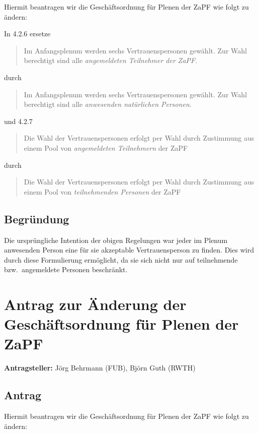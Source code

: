 \documentclass[draft,10pt,oneside]{scrartcl}
\begin{document}
Hiermit beantragen wir die Geschäftsordnung für Plenen der ZaPF wie folgt zu
ändern:

In 4.2.6 ersetze
\begin{quote}
  Im Anfangsplenum werden sechs Vertrauenspersonen gewählt. Zur Wahl berechtigt
  sind alle \emph{angemeldeten Teilnehmer der ZaPF}.
\end{quote}
durch
\begin{quote}
  Im Anfangsplenum werden sechs Vertrauenspersonen gewählt. Zur Wahl berechtigt
  sind alle \emph{anwesenden natürlichen Personen}.
\end{quote}
und 4.2.7
\begin{quote}
  Die Wahl der Vertrauenspersonen erfolgt per Wahl durch Zustimmung aus einem
  Pool von \emph{angemeldeten Teilnehmern} der ZaPF
\end{quote}
durch
\begin{quote}
  Die Wahl der Vertrauenspersonen erfolgt per Wahl durch Zustimmung aus einem
  Pool von \emph{teilnehmenden Personen} der ZaPF
\end{quote}

\subsection*{Begründung}

Die ursprüngliche Intention der obigen Regelungen war jeder im Plenum anwesenden
Person eine für sie akzeptable Vertrauensperson zu finden. Dies wird durch diese
Formulierung ermöglicht, da sie sich nicht nur auf teilnehmende bzw.\  angemeldete
Personen beschränkt.

\newpage

\section*{Antrag zur Änderung der Geschäftsordnung für Plenen der ZaPF}

\textbf{Antragsteller:} Jörg Behrmann (FUB), Björn Guth (RWTH)

\subsection*{Antrag}

Hiermit beantragen wir die Geschäftsordnung für Plenen der ZaPF wie folgt zu
ändern:
\end{document}

